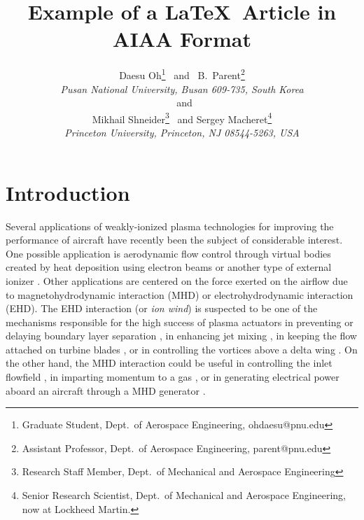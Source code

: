 \documentclass[twoside,9pt,twocolumn]{aiaa}
\author{  Daesu Oh\thanks{Graduate Student, Dept.\ of Aerospace Engineering, ohdaesu@pnu.edu} 
          ~and~ 
          B.\ Parent\thanks{Assistant Professor, Dept.\ of Aerospace Engineering, parent@pnu.edu}\\
          {\it Pusan National University, Busan 609-735, South Korea}\\
          ~and\\
          Mikhail Shneider\thanks{Research Staff Member, Dept.\ of Mechanical and Aerospace
                                  Engineering} 
          ~and 
          Sergey Macheret\thanks{Senior Research Scientist, Dept.\ of Mechanical and Aerospace
                                 Engineering, now at Lockheed Martin.}\\
          {\it Princeton University, Princeton, NJ 08544-5263, USA}\\}
\title{Example of a \LaTeX\ Article in AIAA Format}
\begin{document}
\maketitle
\makenomenclature

\section{Introduction}

\dropword Several applications of weakly-ionized plasma technologies for improving the performance of aircraft have recently been the subject of considerable interest.
One possible application is aerodynamic flow control through virtual bodies created by heat deposition using electron beams or another type of external ionizer \cite{jpp:2008:gaitonde,jpp:2008:shneider,jpp:2008:knight}.  Other applications are centered on the force exerted on the airflow due to magnetohydrodynamic interaction (MHD) or electrohydrodynamic interaction (EHD). The EHD interaction (or \emph{ion wind}) is suspected to be one of the mechanisms responsible for the high success of plasma actuators in preventing or delaying boundary layer separation \cite{aiaa:2009:roupassov}, in enhancing jet mixing \cite{aiaa:2008:benard}, in keeping the flow attached on turbine blades \cite{aiaa:2007:rizzetta}, or in controlling the vortices above a delta wing \cite{aiaa:2008:greenblatt}. On the other hand, the MHD interaction could be useful in controlling the inlet flowfield  \cite{aiaa:2002:shang,aiaaconf:2002:shneider}, in imparting momentum to a gas \cite{jpp:2005:parent,jpp:2007:parent}, or in generating electrical power aboard an aircraft through a MHD generator \cite{jpp:2009:fujino,aiaa:2009:wan}.
 
\end{document}
